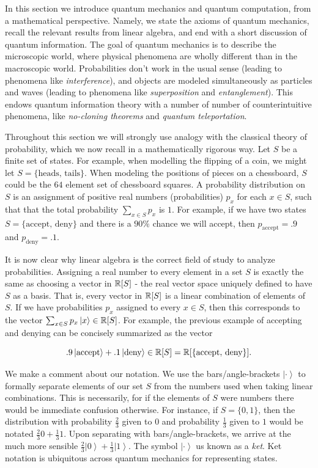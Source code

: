 \documentclass{article}
\theoremstyle{definition}
\numberwithin{figure}{section}
\begin{document}
In this section we introduce quantum mechanics and quantum computation, from a mathematical perspective. Namely, we state the axioms of quantum mechanics, recall the relevant results from linear algebra, and end with a short discussion of quantum information. The goal of quantum mechanics is to describe the microscopic world, where physical phenomena are wholly different than in the macroscopic world. Probabilities don't work in the usual sense (leading to phenomena like \textit{interference}), and objects are modeled simultaneously as particles and waves (leading to phenomena like \textit{superposition} and \textit{entanglement}). This endows quantum information theory with a number of number of counterintuitive phenomena, like \textit{no-cloning theorems} and \textit{quantum teleportation}.

Throughout this section we will strongly use analogy with the classical theory of probability, which we now recall in a mathematically rigorous way. Let $S$ be a finite set of states. For example, when modelling the flipping of a coin, we might let $S=\{\text{heads},\,\text{tails}\}$. When modeling the positions of pieces on a chessboard, $S$ could be the $64$ element set of chessboard squares. A probability distribution on $S$ is an assignment of positive real numbers (probabilities) $p_x$ for each $x\in S$, such that that the total probability $\sum_{x\in S}p_x$ is $1$. For example, if we have two states $S=\{\text{accept},\,\text{deny}\}$ and there is a $90\%$ chance we will accept, then $p_{\text{accept}}=.9$ and $p_{\text{deny}}=.1$.

It is now clear why linear algebra is the correct field of study to analyze probabilities. Assigning a real number to every element in a set $S$ is exactly the same as choosing a vector in $\mathbb{R}[S]$ - the real vector space uniquely defined to have $S$ as a basis. That is, every vector in $\mathbb{R}[S]$ is a linear combination of elements of $S$. If we have probabilities $p_x$ assigned to every $x\in S$, then this corresponds to the vector $\sum_{x\in S}p_x\left |x\right>\in \mathbb{R}[S]$. For example, the previous example of accepting and denying can be concisely summarized as the vector

$$.9\left|\text{accept}\right>+.1\left|\text{deny}\right>\in \mathbb{R}[S]=\mathbb{R}[\{\text{accept},\,\text{deny}\}].$$

We make a comment about our notation. We use the bars/angle-brackets $\left| \cdot \right>$ to formally separate elements of our set $S$ from the numbers used when taking linear combinations. This is necessarily, for if the elements of $S$ were numbers there would be immediate confusion otherwise. For instance, if $S=\{0,1\}$, then the distribution with probability $\frac{2}{3}$ given to $0$ and probability $\frac{1}{3}$ given to $1$ would be notated $\frac{2}{3}0+\frac{1}{3}1$. Upon separating with bars/angle-brackets, we arrive at the much more sensible $\frac{2}{3}\left|0\right>+\frac{1}{3}\left|1\right>$. The symbol $\left|\cdot \right>$ us known as a \textit{ket}. Ket notation is ubiquitous across quantum mechanics for representing states.
\end{document}
